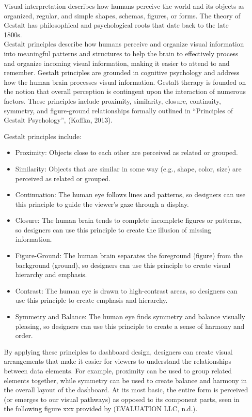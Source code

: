 \documentclass[print]{nuthesis}
\providecommand{\tightlist}{%
  \setlength{\itemsep}{0pt}\setlength{\parskip}{0pt}}
\begin{document}
Visual interpretation describes how humans perceive the world and its objects as organized, regular, and simple shapes, schemas, figures, or forms.
The theory of Gestalt has philosophical and psychological roots that date back to the late 1800s.\\
Gestalt principles describe how humans perceive and organize visual information into meaningful patterns and structures to help the brain to effectively process and organize incoming visual information, making it easier to attend to and remember.
Gestalt principles are grounded in cognitive psychology and address how the human brain processes visual information.
Gestalt therapy is founded on the notion that overall perception is contingent upon the interaction of numerous factors.
These principles include proximity, similarity, closure, continuity, symmetry, and figure-ground relationships formally outlined in ``Principles of Gestalt Psychology'', (Koffka, 2013).

Gestalt principles include:

\begin{itemize}
\tightlist
\item
  Proximity: Objects close to each other are perceived as related or grouped.
\item
  Similarity: Objects that are similar in some way (e.g., shape, color, size) are perceived as related or grouped.
\item
  Continuation: The human eye follows lines and patterns, so designers can use this principle to guide the viewer's gaze through a display.
\item
  Closure: The human brain tends to complete incomplete figures or patterns, so designers can use this principle to create the illusion of missing information.
\item
  Figure-Ground: The human brain separates the foreground (figure) from the background (ground), so designers can use this principle to create visual hierarchy and emphasis.
\item
  Contrast: The human eye is drawn to high-contrast areas, so designers can use this principle to create emphasis and hierarchy.
\item
  Symmetry and Balance: The human eye finds symmetry and balance visually pleasing, so designers can use this principle to create a sense of harmony and order.
\end{itemize}

By applying these principles to dashboard design, designers can create visual arrangements that make it easier for viewers to understand the relationships between data elements.
For example, proximity can be used to group related elements together, while symmetry can be used to create balance and harmony in the overall layout of the dashboard.
At its most basic, the entire form is perceived (or emerges to our visual pathways) as opposed to its component parts, seen in the following figure xxx provided by (EVALUATION LLC, n.d.).
\end{document}
